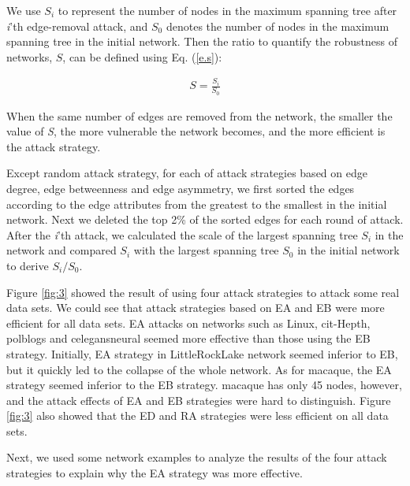 \documentclass[aps,prl,twocolumn,showpacs,superscriptaddress,groupedaddress]{revtex4}  %
\begin{document}
We use $S_i$ to represent the number of nodes in the maximum spanning tree after \emph{i}'th edge-removal attack, and $S_0$ denotes the number of nodes in the maximum spanning tree in the initial network. Then the ratio to quantify the robustness of networks, $S$, can be defined using Eq. (\ref{e.s}):

\setlength{\abovedisplayskip}{2pt}
\begin{eqnarray}
S=\frac{S_{i}}{S_{0}}
\label{e.s}
\end{eqnarray}
\setlength{\belowdisplayskip}{2pt}

When the same number of edges are removed from the network, the smaller the value of \emph{S}, the more vulnerable the network becomes, and the more efficient is the attack strategy.


Except random attack strategy, for each of attack strategies based on edge degree, edge betweenness and edge asymmetry, we first sorted the edges according to the edge attributes from the greatest to the smallest in the initial network. Next we deleted the top 2\% of the sorted edges for each round of attack. After the \emph{i}'th attack, we calculated the scale of the largest spanning tree $S_{i}$ in the network and compared $S_{i}$ with the largest spanning tree $S_{0}$ in the initial network to derive $S_{i}/S_{0}$.

Figure \ref{fig:3} showed the result of using four attack strategies to attack some real data sets. We could see that attack strategies based on EA and EB were more efficient for all data sets. EA attacks on networks such as Linux, cit-Hepth, polblogs and celegansneural seemed more effective than those using the EB strategy. Initially, EA strategy in LittleRockLake network seemed inferior to EB, but it quickly led to the collapse of the whole network. As for macaque, the EA strategy seemed inferior to the EB strategy. macaque has only 45 nodes, however, and  the attack effects of EA and EB strategies were hard to distinguish. Figure \ref{fig:3} also showed that the ED and RA strategies were less efficient on all data sets.


Next, we used some network examples to analyze the results of the four attack strategies to explain why the EA strategy was more effective.
\end{document}
